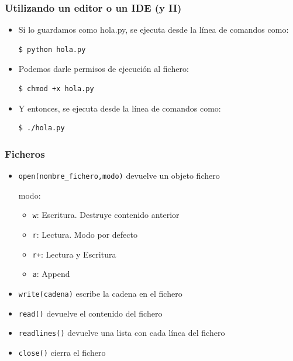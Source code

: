 \documentclass{beamer}
\begin{document}
\begin{frame}[fragile]
\frametitle{Utilizando un editor o un IDE (y II)}


\begin{itemize}
  \item Si lo guardamos como hola.py, se ejecuta desde la línea de comandos como:
\begin{footnotesize}
\begin{verbatim}
$ python hola.py
\end{verbatim}
\end{footnotesize}

  \item Podemos darle permisos de ejecución al fichero:
\begin{footnotesize}
\begin{verbatim}
$ chmod +x hola.py
\end{verbatim}
\end{footnotesize}

  \item Y entonces, se ejecuta desde la línea de comandos como:
\begin{footnotesize}
\begin{verbatim}
$ ./hola.py
\end{verbatim}
\end{footnotesize}


  
\end{itemize}

\end{frame}



\begin{frame}[fragile]
\frametitle{Ficheros}
\begin{itemize}
  
\item \verb|open(nombre_fichero,modo)| devuelve un objeto fichero

modo:
\begin{itemize}
  
\item \verb|w|: Escritura. Destruye contenido anterior
\item \verb|r|: Lectura. Modo por defecto
\item \verb|r+|: Lectura y Escritura
\item \verb|a|: Append

\end{itemize}

\item \verb|write(cadena)| escribe la cadena en el fichero  
\item \verb|read()| devuelve el contenido del fichero
\item \verb|readlines()| devuelve una lista con cada línea del fichero
\item \verb|close()| cierra el fichero

\end{itemize}
\end{frame}
\end{document}
